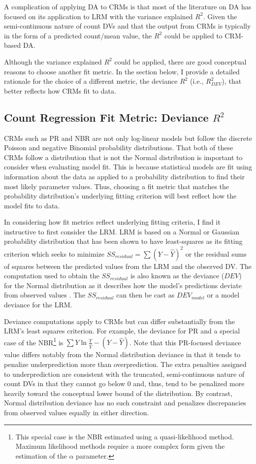 \documentclass[man]{apa7}
\begin{document}
	A complication of applying DA to CRMs is that most of the literature on DA has focused on its application to LRM with the variance explained $R^2$.
	Given the semi-continuous nature of count DVs and that the output from CRMs is typically in the form of a predicted count/mean value, the $R^2$ could be applied to CRM-based DA.
	
	Although the variance explained $R^2$ could be applied, there are good conceptual reasons to choose another fit metric. 
	In the section below, I provide a detailed rationale for the choice of a different metric, the deviance $R^2$ (i.e., $R^2_{DEV}$), that better reflects how CRMs fit to data. 
	
	\subsection{Count Regression Fit Metric: Deviance $R^2$}
	
	CRMs such as PR and NBR are not only log-linear models but follow the discrete Poisson and negative Binomial probability distributions.
	That both of these CRMs follow a distribution that is not the Normal distribution is important to consider when evaluating model fit.
	This is because statistical models are fit using information about the data as applied to a probability distribution to find their most likely parameter values.
	Thus, choosing a fit metric that matches the probability distribution's underlying fitting criterion will best reflect how the model fits to data.
	
	In considering how fit metrics reflect underlying fitting criteria, I find it instructive to first consider the LRM.
	LRM is based on a Normal or Gaussian probability distribution that has been shown to have least-squares as its fitting criterion which seeks to minimize $SS_{residual} = \sum (Y - \hat{Y})^2$ or the residual sums of squares between the predicted values from the LRM and the observed DV. The computation used to obtain the $SS_{residual}$ is also known as the deviance ($DEV$) for the Normal distribution as it describes how the model's predictions deviate from observed values \parencite{mccullagh2019generalized}.
	The $SS_{residual}$ can then be cast as $DEV_{model}$ or a model deviance for the LRM.
	
	Deviance computations apply to CRMs but can differ substantially from the LRM's least squares criterion.
	For example, the deviance for PR and a special case of the NBR\footnote{
		This special case is the NBR estimated using a quasi-likelihood method. 
		Maximum likelihood methods require a more complex form given the estimation of the $\alpha$ parameter.} 
	is $\sum Y\ln \frac{Y}{\hat{Y}} - (Y - \hat{Y})$. 
	Note that this PR-focused deviance value differs notably from the Normal distribution deviance in that it tends to penalize underprediction more than overprediction.
	The extra penalties assigned to underprediction are consistent with the truncated, semi-continuous nature of count DVs in that they cannot go below 0 and, thus, tend to be penalized more heavily toward the conceptual lower bound of the distribution.
	By contrast, Normal distribution deviance has no such constraint and penalizes discrepancies from observed values equally in either direction.
	
\end{document}
